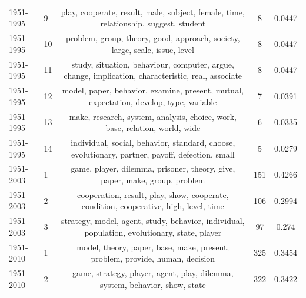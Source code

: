 \documentclass{article}
\theoremstyle{definition}
\begin{document}
\begin{table}[!hbtp]
\begin{center}
{\begin{tabular}{llccc}
             1951-1995 &               9 &                          play, cooperate, result, male, subject, female, time, relationship, suggest, student &                8 &                  0.0447 \\
             1951-1995 &              10 &                                   problem, group, theory, good, approach, society, large, scale, issue, level &                8 &                  0.0447 \\
             1951-1995 &              11 &            study, situation, behaviour, computer, argue, change, implication, characteristic, real, associate &                8 &                  0.0447 \\
             1951-1995 &              12 &                        model, paper, behavior, examine, present, mutual, expectation, develop, type, variable &                7 &                  0.0391 \\
             1951-1995 &              13 &                                   make, research, system, analysis, choice, work, base, relation, world, wide &                6 &                  0.0335 \\
             1951-1995 &              14 &               individual, social, behavior, standard, choose, evolutionary, partner, payoff, defection, small &                5 &                  0.0279 \\
             \midrule
             1951-2003 &               1 &                                    game, player, dilemma, prisoner, theory, give, paper, make, group, problem &              151 &                  0.4266 \\
             1951-2003 &               2 &                         cooperation, result, play, show, cooperate, condition, cooperative, high, level, time &              106 &                  0.2994 \\
             1951-2003 &               3 &                  strategy, model, agent, study, behavior, individual, population, evolutionary, state, player &               97 &                   0.274 \\
             \midrule
             1951-2010 &               1 &                                  model, theory, paper, base, make, present, problem, provide, human, decision &              325 &                  0.3454 \\
             1951-2010 &               2 &                                   game, strategy, player, agent, play, dilemma, system, behavior, show, state &              322 &                  0.3422 \\

\end{tabular}}
\end{center}
\end{table}
\end{document}
